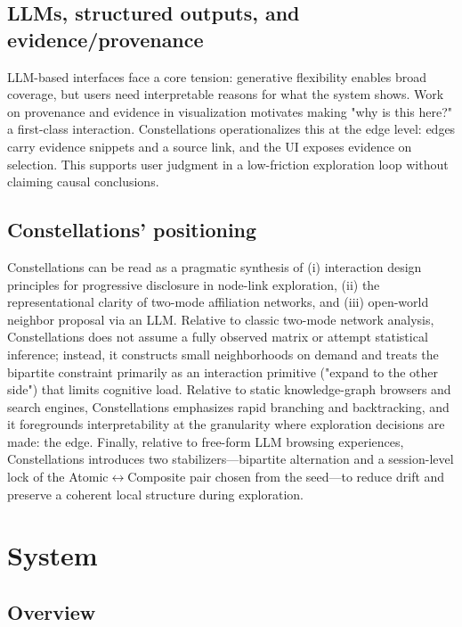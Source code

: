\subsection{LLMs, structured outputs, and evidence/provenance}

LLM-based interfaces face a core tension: generative flexibility enables broad coverage, but users need interpretable reasons for what the system shows. Work on provenance and evidence in visualization motivates making "why is this here?" a first-class interaction. Constellations operationalizes this at the edge level: edges carry evidence snippets and a source link, and the UI exposes evidence on selection. This supports user judgment in a low-friction exploration loop without claiming causal conclusions.

\subsection{Constellations' positioning}

Constellations can be read as a pragmatic synthesis of (i) interaction design principles for progressive disclosure in node-link exploration, (ii) the representational clarity of two-mode affiliation networks, and (iii) open-world neighbor proposal via an LLM. Relative to classic two-mode network analysis, Constellations does not assume a fully observed matrix or attempt statistical inference; instead, it constructs small neighborhoods on demand and treats the bipartite constraint primarily as an interaction primitive ("expand to the other side") that limits cognitive load. Relative to static knowledge-graph browsers and search engines, Constellations emphasizes rapid branching and backtracking, and it foregrounds interpretability at the granularity where exploration decisions are made: the edge. Finally, relative to free-form LLM browsing experiences, Constellations introduces two stabilizers---bipartite alternation and a session-level lock of the Atomic\(\leftrightarrow\)Composite pair chosen from the seed---to reduce drift and preserve a coherent local structure during exploration.

\section{System}

\subsection{Overview}

